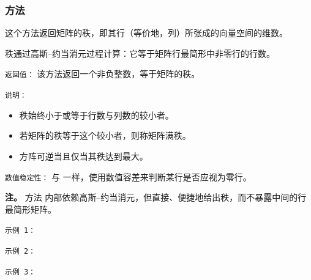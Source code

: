 \subsubsection{方法 }
\label{ssub:method_matrix_rank}

这个方法返回矩阵的秩，即其行（等价地，列）所张成的向量空间的维数。

\medskip
秩通过高斯–约当消元过程计算：它等于矩阵行最简形中非零行的行数。

\medskip
\texttt{返回值：}
该方法返回一个非负整数，等于矩阵的秩。

\medskip
\texttt{说明：}
\begin{itemize}
\item 秩始终小于或等于行数与列数的较小者。
\item 若矩阵的秩等于这个较小者，则称矩阵满秩。
\item 方阵可逆当且仅当其秩达到最大。
\end{itemize}

\medskip
\texttt{数值稳定性：}
与  一样，使用数值容差来判断某行是否应视为零行。

\medskip
\noindent
\textbf{注。}
方法  内部依赖高斯–约当消元，但直接、便捷地给出秩，而不暴露中间的行最简形矩阵。

\texttt{示例 1：}

\begin{tkzexample}[latex=.5\textwidth]
\end{tkzexample}

\texttt{示例 2：}

\begin{tkzexample}[latex=.5\textwidth]
\end{tkzexample}

\texttt{示例 3：}

\begin{tkzexample}[latex=.5\textwidth]


\end{tkzexample}


